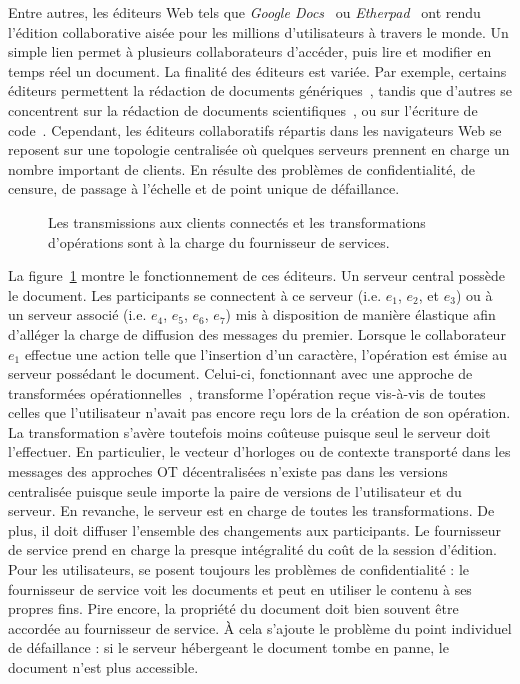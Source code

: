 Entre autres, les éditeurs Web tels que \emph{Google Docs}~\cite{googledocs} ou
\emph{Etherpad}~\cite{etherpad} ont rendu l'édition collaborative aisée pour les
millions d'utilisateurs à travers le monde. Un simple lien permet à plusieurs
collaborateurs d'accéder, puis lire et modifier en temps réel un document. La
finalité des éditeurs est variée. Par exemple, certains éditeurs permettent la
rédaction de documents génériques~\cite{etherpad, googledocs, googlewave,
  hivejs}, tandis que d'autres se concentrent sur la rédaction de documents
scientifiques~\cite{authorea, overleaf, sharelatex, fidus}, ou sur l'écriture de
code~\cite{lautamaki2012cored, hyperdev}.  Cependant, les éditeurs collaboratifs
répartis dans les navigateurs Web se reposent sur une topologie centralisée où
quelques serveurs prennent en charge un nombre important de clients. En résulte
des problèmes de confidentialité, de censure, de passage à l'échelle et de point
unique de défaillance.



\begin{figure}
  \begin{center}
    
    \caption[Fonctionnement des éditeurs centralisés]
    {\label{editor:fig:serviceprovider} Les transmissions aux clients connectés
      et les transformations d'opérations sont à la charge du fournisseur de
      services.}
  \end{center}
\end{figure}

La figure~\ref{editor:fig:serviceprovider} montre le fonctionnement de ces
éditeurs. Un serveur central possède le document. Les participants se connectent
à ce serveur (i.e. $e_1$, $e_2$, et $e_3$) ou à un serveur associé (i.e. $e_4$,
$e_5$, $e_6$, $e_7$) mis à disposition de manière élastique afin d'alléger la
charge de diffusion des messages du premier. Lorsque le collaborateur $e_1$
effectue une action telle que l'insertion d'un caractère, l'opération est émise
au serveur possédant le document. Celui-ci, fonctionnant avec une approche de
transformées opérationnelles~\cite{nichols1995high}, transforme l'opération
reçue vis-à-vis de toutes celles que l'utilisateur n'avait pas encore reçu lors
de la création de son opération. La transformation s'avère toutefois moins
coûteuse puisque seul le serveur doit l'effectuer. En particulier, le vecteur
d'horloges ou de contexte transporté dans les messages des approches OT
décentralisées n'existe pas dans les versions centralisée puisque seule importe
la paire de versions de l'utilisateur et du serveur. En revanche, le serveur est
en charge de toutes les transformations. De plus, il doit diffuser l'ensemble
des changements aux participants. Le fournisseur de service prend en charge la
presque intégralité du coût de la session d'édition. Pour les utilisateurs, se
posent toujours les problèmes de confidentialité : le fournisseur de service
voit les documents et peut en utiliser le contenu à ses propres fins. Pire
encore, la propriété du document doit bien souvent être accordée au fournisseur
de service. À cela s'ajoute le problème du point individuel de défaillance : si
le serveur hébergeant le document tombe en panne, le document n'est plus
accessible.

